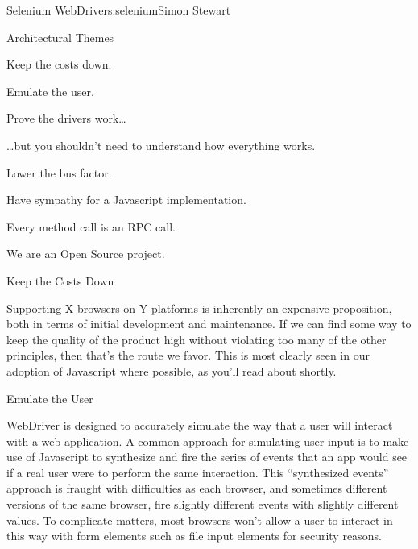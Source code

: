 \begin{aosachapter}{Selenium WebDriver}{s:selenium}{Simon Stewart}
\begin{aosasect1}{Architectural Themes}
\begin{aosaitemize}

\item Keep the costs down.

\item Emulate the user.

\item Prove the drivers work{\ldots}

\item {\ldots}but you shouldn't need to understand how everything works.

\item Lower the bus factor.

\item Have sympathy for a Javascript implementation.

\item Every method call is an RPC call.

\item We are an Open Source project.

\end{aosaitemize}

\begin{aosasect2}{Keep the Costs Down}

Supporting X browsers on Y platforms is inherently an expensive
proposition, both in terms of initial development and maintenance. If
we can find some way to keep the quality of the product high without
violating too many of the other principles, then that's the route we
favor. This is most clearly seen in our adoption of Javascript where
possible, as you'll read about shortly.

\end{aosasect2}

\begin{aosasect2}{Emulate the User}

WebDriver is designed to accurately simulate the way that a user will
interact with a web application. A common approach for simulating user
input is to make use of Javascript to synthesize and fire the series
of events that an app would see if a real user were to perform the
same interaction. This ``synthesized events'' approach is fraught with
difficulties as each browser, and sometimes different versions of the
same browser, fire slightly different events with slightly different
values. To complicate matters, most browsers won't allow a user to
interact in this way with form elements such as file input
elements for security reasons.


\end{aosasect2}
\end{aosasect1}
\end{aosachapter}

